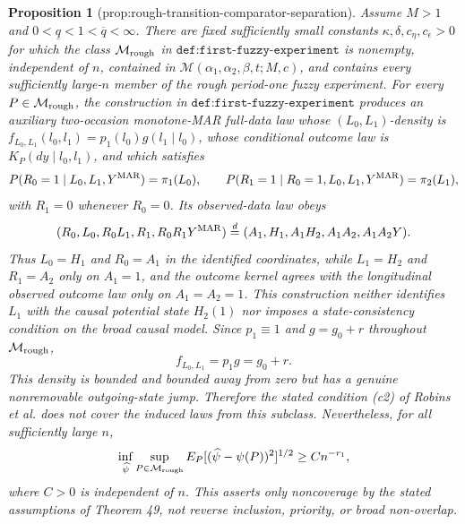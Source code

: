 \documentclass{article}
\newtheorem{proposition}{Proposition}
\begin{document}
\begin{proposition}[prop:rough-transition-comparator-separation]\label{prop:rough-transition-comparator-separation}
Assume \(M>1\) and \(0<\underline q<1<\overline q<\infty\). There are fixed sufficiently small constants \(\kappa,\delta,c_\eta,c_\epsilon>0\) for which the class \(\mathcal M_{\rm rough}\) in \(\texttt{def:first-fuzzy-experiment}\) is nonempty, independent of \(n\), contained in \(\mathcal M(\alpha_1,\alpha_2,\beta,t;M,c)\), and contains every sufficiently large-\(n\) member of the rough period-one fuzzy experiment. For every \(P\in\mathcal M_{\rm rough}\), the construction in \(\texttt{def:first-fuzzy-experiment}\) produces an auxiliary two-occasion monotone-MAR full-data law whose \((L_0,L_1)\)-density is \(f_{L_0,L_1}(l_0,l_1)=p_1(l_0)g(l_1\mid l_0)\), whose conditional outcome law is \(K_P(dy\mid l_0,l_1)\), and which satisfies
\[
P(R_0=1\mid L_0,L_1,Y^{\rm MAR})=\pi_1(L_0),
\qquad
P(R_1=1\mid R_0=1,L_0,L_1,Y^{\rm MAR})=\pi_2(L_1),
\]
with \(R_1=0\) whenever \(R_0=0\). Its observed-data law obeys
\[
(R_0,L_0,R_0L_1,R_1,R_0R_1Y^{\rm MAR})
\overset{d}{=}
(A_1,H_1,A_1H_2,A_1A_2,A_1A_2Y).
\]
Thus \(L_0=H_1\) and \(R_0=A_1\) in the identified coordinates, while \(L_1=H_2\) and \(R_1=A_2\) only on \(A_1=1\), and the outcome kernel agrees with the longitudinal observed outcome law only on \(A_1=A_2=1\). This construction neither identifies \(L_1\) with the causal potential state \(H_2(1)\) nor imposes a state-consistency condition on the broad causal model. Since \(p_1\equiv1\) and \(g=g_0+r\) throughout \(\mathcal M_{\rm rough}\),
\[
f_{L_0,L_1}=p_1g=g_0+r.
\]
This density is bounded and bounded away from zero but has a genuine nonremovable outgoing-state jump. Therefore the stated condition (c2) of Robins et al. does not cover the induced laws from this subclass. Nevertheless, for all sufficiently large \(n\),
\[
\inf_{\widehat\psi}\sup_{P\in\mathcal M_{\rm rough}}E_P[(\widehat\psi-\psi(P))^2]^{1/2}\ge C n^{-r_1},
\]
where \(C>0\) is independent of \(n\). This asserts only noncoverage by the stated assumptions of Theorem 49, not reverse inclusion, priority, or broad non-overlap.
\end{proposition}
\end{document}

